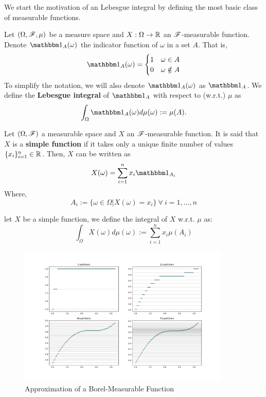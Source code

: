 \documentclass[../TGMAFFIRO.tex]{subfiles}
\begin{document}
We start the motivation of an Lebesgue integral by defining the most basic class of measurable functions.

\begin{definition}
	Let $(\Omega, \mathscr{F}, \mu)$ be a measure space and $X: \Omega \to \mathbb{R}$ an $\mathscr{F}$-measurable function. Denote $\ind_A(\omega)$ the indicator function of $\omega$ in a set $A$. That is,
	\[
	\ind_A(\omega) = 
		\begin{cases}
			1 & \omega \in A \\
			0 & \omega \notin A
		\end{cases}
	\]
	To simplify the notation, we will also denote $\ind_A(\omega)$ as $\ind_A$.
	We define the \textbf{Lebesgue integral} of $\ind_A$ with respect to (w.r.t.) $\mu$ as
	\begin{equation}
		\int_\Omega \ind_A(\omega) d\mu(\omega) := \mu(A).
	\end{equation}
	
\end{definition}

\begin{definition}
	Let $(\Omega, \mathscr{F})$ a measurable space and $X$ an $\mathscr{F}$-measurable function. It is said that $X$ is a \textbf{simple function} if it takes only a unique finite number of values $\{x_i\}_{i=1}^{n} \in \mathbb{R}$. Then, $X$ can be written as
	\begin{equation}
		X(\omega) = \sum_{i=1}^{n}x_i\ind_{A_i}
	\end{equation}
	Where,
	\[
		A_i := \{\omega \in \Omega | X(\omega) = x_i\} \ \forall \ i = 1, \ldots, n
	\]
\end{definition}

\begin{definition}
	let $X$ be a simple function, we define the integral of $X$ w.r.t. $\mu$ as:
	\begin{equation}
		\int_\Omega X(\omega) d\mu(\omega) := \sum_{i=1}^{n}x_i\mu(A_i)
	\end{equation}
\end{definition}


\begin{figure}[h]
	\centering
	\label{fig:simple_approx_sine}
	\includegraphics[width=0.9\textwidth]{images/simple_sine.pdf}	
	\caption{Approximation of a Borel-Measurable Function}
\end{figure}
\end{document}
